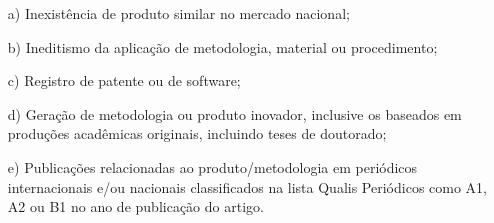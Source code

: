 {\begin{lmarginbox}
\begin{enumerate}[leftmargin=1cm, font=\bfseries]
\begin{enumerate}[font=\bfseries]
                    \begin{enumerate}[font=\bfseries]
                        \item[a)] Inexistência de produto similar no mercado nacional;
                        \item[b)] Ineditismo da aplicação de metodologia, material ou procedimento;
                        \item[c)] Registro de patente ou de software;
                        \item[d)] Geração de metodologia ou produto inovador, inclusive os baseados em produções acadêmicas originais, incluindo teses de doutorado;
                        \item[e)] Publicações relacionadas ao produto/metodologia em periódicos internacionais e/ou nacionais classificados na lista Qualis Periódicos como A1, A2 ou B1 no ano de publicação do artigo.
                    \end{enumerate}
            \end{enumerate}


\end{enumerate}
\end{lmarginbox}}
